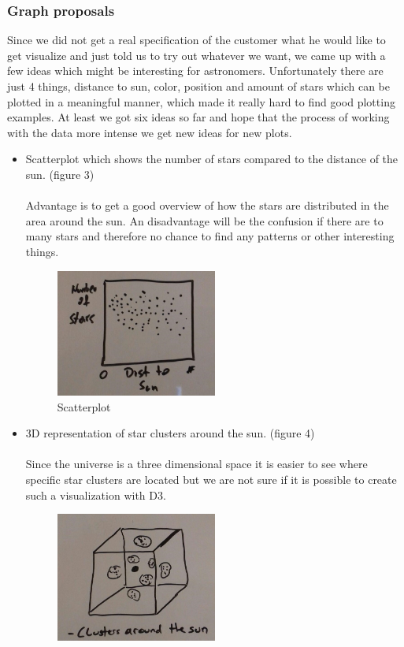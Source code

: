 \documentclass{article}
\begin{document}
\subsubsection{Graph proposals}
Since we did not get a real specification of the customer what he would like to get visualize and just told us to try out whatever we want, we came up with a few ideas which might be interesting for astronomers. Unfortunately there are just 4 things, distance to sun, color, position and amount of stars which can be plotted in a meaningful manner, which made it really hard to find good plotting examples. At least we got six ideas so far and hope that the process of working with the data more intense we get new ideas for new plots.
\begin{itemize}
\item Scatterplot which shows the number of stars compared to the distance of the sun. (figure 3)\\
\\
Advantage is to get a good overview of how the stars are distributed in the area around the sun.
An disadvantage will be the confusion if there are to many stars and therefore no chance to find any patterns or other interesting things.
\begin{figure}[!h]
\centering
\includegraphics[width=0.5\textwidth]{images/NumbStarsDistSun.jpg}
	\caption{Scatterplot}
	\label{fig3}
\end{figure}
\item 3D representation of star clusters around the sun. (figure 4)\\
\\
Since the universe is a three dimensional space it is easier to see where specific star clusters are located but we are not sure if it is possible to create such a visualization with D3.
\begin{figure}[!h]
\centering
\includegraphics[width=0.5\textwidth]{images/ClustersSun3d.jpg}

\end{figure}
\end{itemize}
\end{document}
